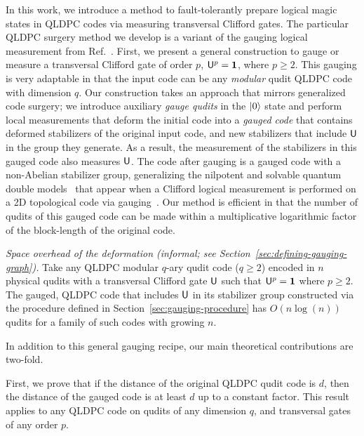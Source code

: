 \documentclass[11pt]{article}
\begin{document}
In this work, we introduce a method to fault-tolerantly prepare logical magic states in QLDPC codes via measuring transversal Clifford gates. 
The particular QLDPC surgery method we develop is a variant of the gauging logical measurement from Ref.~\cite{williamson2024lowoverheadfaulttolerantquantumcomputation}. 
First, we present a general construction to gauge or measure a transversal Clifford gate of order $p$, $\mathsf{U}^p=\mathbf{1}$, where $p\ge 2$.
This gauging is very adaptable in that the input code can be any \textit{modular} qudit QLDPC code with dimension $q$.
Our construction takes an approach that mirrors generalized code surgery; we introduce auxiliary \textit{gauge qudits} in the $\ket{0}$ state and perform local measurements that deform the initial code into a \textit{gauged code} that contains deformed stabilizers of the original input code, and new stabilizers that include $\mathsf{U}$ in the group they generate. As a result, the measurement of the stabilizers in this gauged code also measures $\mathsf{U}$. 
The code after gauging is a gauged code with a non-Abelian stabilizer group, generalizing the nilpotent and solvable quantum double models~\cite{Kitaev_2003,Tantivasadakarn_2024} that appear when a Clifford logical measurement is performed on a 2D topological code via gauging~\cite{davydova2025universal, sajith2025noncliffordgatesstabilizercodes}.
Our method is efficient in that the number of qudits of this gauged code can be made within a multiplicative logarithmic factor of the block-length of the original code.

\begin{theorem}
    \emph{Space overhead of the deformation (informal; see Section~\ref{sec:defining-gauging-graph}).} Take any QLDPC modular $q$-ary qudit code ($q\ge 2$) encoded in $n$ physical qudits with a transversal Clifford gate $\mathsf{U}$ such that $\mathsf{U}^p=\mathbf{1}$ where $p\ge 2$.  The gauged, QLDPC code that includes $\mathsf{U}$ in its stabilizer group constructed via the procedure defined in Section~\ref{sec:gauging-procedure} 
    has $O(n\log(n))$ qudits for a family of such codes with growing $n$.
\end{theorem}

\noindent In addition to this general gauging recipe, our main theoretical contributions are two-fold.


First, we prove that if the distance of the original QLDPC qudit code is $d$, then the distance of the gauged code is at least $d$ up to a constant factor.
This result applies to any QLDPC code on qudits of any dimension $q$, and transversal gates of any order $p$.
\end{document}
